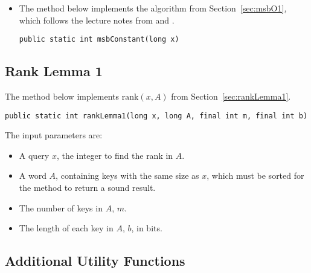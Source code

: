 \begin{itemize}
    \item
    The method below implements the algorithm from Section~\ref{sec:msbO1}, which follows the lecture notes from \cite{erikdemainelec12} and \cite{nelsonjelanilec2}.
    \begin{lstlisting}
public static int msbConstant(long x)
    \end{lstlisting}
    
\end{itemize}

\subsection{Rank Lemma 1} \label{sec:rankLemma1Implementation}

The method below implements $\text{rank}(x,A)$ from Section~\ref{sec:rankLemma1}.
\begin{lstlisting}
public static int rankLemma1(long x, long A, final int m, final int b)
\end{lstlisting}
The input parameters are:
\begin{itemize}
    \item
    A query $x$, the integer to find the rank in $A$.
    
    \item
    A word $A$, containing keys with the same size as $x$, which must be sorted for the method to return a sound result.
    
    \item
    The number of keys in $A$, $m$.
    
    \item
    The length of each key in $A$, $b$, in bits.
\end{itemize}

\subsection{Additional Utility Functions}

